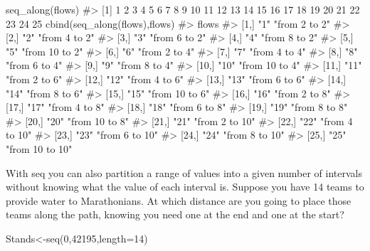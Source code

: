 \documentclass[
  letterpaper,
  DIV=11,
  numbers=noendperiod]{scrreprt}
\newenvironment{Shaded}{\begin{snugshade}}{\end{snugshade}}
\newcommand{\AttributeTok}[1]{\textcolor[rgb]{0.40,0.45,0.13}{#1}}
\newcommand{\CommentTok}[1]{\textcolor[rgb]{0.37,0.37,0.37}{#1}}
\newcommand{\DecValTok}[1]{\textcolor[rgb]{0.68,0.00,0.00}{#1}}
\newcommand{\FunctionTok}[1]{\textcolor[rgb]{0.28,0.35,0.67}{#1}}
\newcommand{\NormalTok}[1]{\textcolor[rgb]{0.00,0.23,0.31}{#1}}
\newcommand{\OtherTok}[1]{\textcolor[rgb]{0.00,0.23,0.31}{#1}}
\begin{document}
\begin{Shaded}
\begin{Highlighting}[]
\FunctionTok{seq\_along}\NormalTok{(flows)}
\CommentTok{\#\textgreater{}  [1]  1  2  3  4  5  6  7  8  9 10 11 12 13 14 15 16 17 18 19 20 21 22 23 24 25}
\FunctionTok{cbind}\NormalTok{(}\FunctionTok{seq\_along}\NormalTok{(flows),flows)}
\CommentTok{\#\textgreater{}            flows             }
\CommentTok{\#\textgreater{}  [1,] "1"  "from  2  to  2"  }
\CommentTok{\#\textgreater{}  [2,] "2"  "from  4  to  2"  }
\CommentTok{\#\textgreater{}  [3,] "3"  "from  6  to  2"  }
\CommentTok{\#\textgreater{}  [4,] "4"  "from  8  to  2"  }
\CommentTok{\#\textgreater{}  [5,] "5"  "from  10  to  2" }
\CommentTok{\#\textgreater{}  [6,] "6"  "from  2  to  4"  }
\CommentTok{\#\textgreater{}  [7,] "7"  "from  4  to  4"  }
\CommentTok{\#\textgreater{}  [8,] "8"  "from  6  to  4"  }
\CommentTok{\#\textgreater{}  [9,] "9"  "from  8  to  4"  }
\CommentTok{\#\textgreater{} [10,] "10" "from  10  to  4" }
\CommentTok{\#\textgreater{} [11,] "11" "from  2  to  6"  }
\CommentTok{\#\textgreater{} [12,] "12" "from  4  to  6"  }
\CommentTok{\#\textgreater{} [13,] "13" "from  6  to  6"  }
\CommentTok{\#\textgreater{} [14,] "14" "from  8  to  6"  }
\CommentTok{\#\textgreater{} [15,] "15" "from  10  to  6" }
\CommentTok{\#\textgreater{} [16,] "16" "from  2  to  8"  }
\CommentTok{\#\textgreater{} [17,] "17" "from  4  to  8"  }
\CommentTok{\#\textgreater{} [18,] "18" "from  6  to  8"  }
\CommentTok{\#\textgreater{} [19,] "19" "from  8  to  8"  }
\CommentTok{\#\textgreater{} [20,] "20" "from  10  to  8" }
\CommentTok{\#\textgreater{} [21,] "21" "from  2  to  10" }
\CommentTok{\#\textgreater{} [22,] "22" "from  4  to  10" }
\CommentTok{\#\textgreater{} [23,] "23" "from  6  to  10" }
\CommentTok{\#\textgreater{} [24,] "24" "from  8  to  10" }
\CommentTok{\#\textgreater{} [25,] "25" "from  10  to  10"}
\end{Highlighting}
\end{Shaded}

With seq you can also partition a range of values into a given number of
intervals without knowing what the value of each interval is. Suppose
you have 14 teams to provide water to Marathonians. At which distance
are you going to place those teams along the path, knowing you need one
at the end and one at the start?

\begin{Shaded}
\begin{Highlighting}[]
\NormalTok{Stands}\OtherTok{\textless{}{-}}\FunctionTok{seq}\NormalTok{(}\DecValTok{0}\NormalTok{,}\DecValTok{42195}\NormalTok{,}\AttributeTok{length=}\DecValTok{14}\NormalTok{)}
\end{Highlighting}
\end{Shaded}
\end{document}
